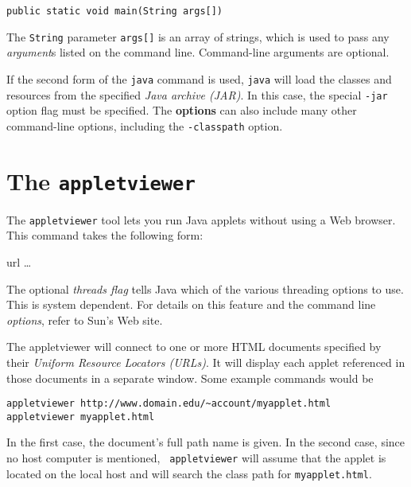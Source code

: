 \begin{jjjlisting}
\begin{lstlisting}
public static void main(String args[])
\end{lstlisting}
\end{jjjlisting}

\noindent The {\tt String} parameter {\tt args[]} is an array
of strings, which is used to pass any {\it argument}s listed on the
command line.  Command-line arguments are optional.

If the second form of the {\tt java} command is used, {\tt java} will
load the classes and resources from the specified {\it Java archive
(JAR)}. In this case, the special {\tt -jar} option flag must be
specified. The {\bf options} can also include many other command-line
options, including the {\tt -classpath} option.


\section*{The {\tt appletviewer}}
\noindent The {\tt appletviewer} tool lets you run Java applets without using
a Web browser.   This command takes the following form:

\vspace{6pt plus3pt minus2pt}
  \qquad 
 [ {\it options } ] \qquad 
 url \dots

\vspace{6pt plus3pt minus2pt}\noindent The optional {\it threads flag} tells Java which of the various
threading options to use.  This is system dependent.  For details on
this feature and the command line {\it options}, refer to Sun's Web site.

The appletviewer will connect to one or more HTML documents specified
by their {\it Uniform Resource Locators (URLs)}. It will display each
applet referenced in those documents in a separate window.  Some
example commands would be

\begin{jjjlisting}
\begin{lstlisting}
appletviewer http://www.domain.edu/~account/myapplet.html
appletviewer myapplet.html
\end{lstlisting}
\end{jjjlisting}

\noindent In the first case, the document's full path name is
given.  In the second case, since no host computer is mentioned, {\tt
appletviewer} will assume that the applet is located on the local host
and will search the class path for {\tt myapplet.html}.

